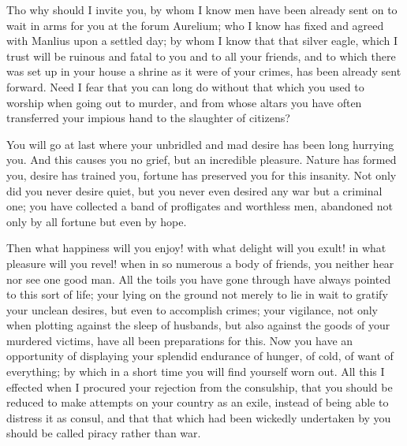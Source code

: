 \documentclass[a4paper]{amsbook}
\begin{document}
Tho why should I invite you, by whom I know men have been already sent on to wait in arms for you at the forum Aurelium; who I know has fixed and agreed with Manlius upon a settled day; by whom I know that that silver eagle, which I trust will be ruinous and fatal to you and to all your friends, and to which there was set up in your house a shrine as it were of your crimes, has been already sent forward. Need I fear that you can long do without that which you used to worship when going out to murder, and from whose altars you have often transferred your impious hand to the slaughter of citizens?

You will go at last where your unbridled and mad desire has been long hurrying you. And this causes you no grief, but an incredible pleasure. Nature has formed you, desire has trained you, fortune has preserved you for this insanity. Not only did you never desire quiet, but you never even desired any war but a criminal one; you have collected a band of profligates and worthless men, abandoned not only by all fortune but even by hope.

Then what happiness will you enjoy! with what delight will you exult! in what pleasure will you revel! when in so numerous a body of friends, you neither hear nor see one good man. All the toils you have gone through have always pointed to this sort of life; your lying on the ground not merely to lie in wait to gratify your unclean desires, but even to accomplish crimes; your vigilance, not only when plotting against the sleep of husbands, but also against the goods of your murdered victims, have all been preparations for this. Now you have an opportunity of displaying your splendid endurance of hunger, of cold, of want of everything; by which in a short time you will find yourself worn out. All this I effected when I procured your rejection from the consulship, that you should be reduced to make attempts on your country as an exile, instead of being able to distress it as consul, and that that which had been wickedly undertaken by you should be called piracy rather than war.
\end{document}

